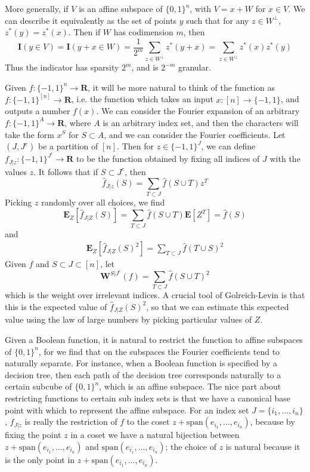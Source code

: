 More generally, if $V$ is an affine subspace of $\{ 0, 1 \}^n$, with $V = x + W$ for $x \in V$. We can describe it equivalently as the set of points $y$ such that for any $z \in W^\perp$, $z^*(y) = z^*(x)$. Then if $W$ has codimension $m$, then
%
\[ \mathbf{I}(y \in V) = \mathbf{I}(y + x \in W) = \frac{1}{2^m} \sum_{z \in W^\perp} z^*(y + x) = \sum_{z \in W^\perp} z^*(x) z^*(y) \]
%
Thus the indicator has sparsity $2^m$, and is $2^{-m}$ granular.

Given $f: \{ -1, 1 \}^n \to \mathbf{R}$, it will be more natural to think of the function as $f: \{ -1, 1 \}^{[n]} \to \mathbf{R}$, i.e. the function which takes an input $x: [n] \to \{ -1, 1 \}$, and outputs a number $f(x)$. We can consider the Fourier expansion of an arbitrary $f: \{ -1, 1 \}^A \to \mathbf{R}$, where $A$ is an arbitrary index set, and then the characters will take the form $x^S$ for $S \subset A$, and we can consider the Fourier coefficients. Let $(J,J^c)$ be a partition of $[n]$. Then for $z \in \{ -1, 1 \}^J$, we can define $f_{J|z}: \{ -1, 1 \}^{J^c} \to \mathbf{R}$ to be the function obtained by fixing all indices of $J$ with the values $z$. It follows that if $S \subset J^c$, then
%
\[ \widehat{f}_{J|z}(S) = \sum_{T \subset J} \widehat{f}(S \cup T) z^T \]
%
Picking $z$ randomly over all choices, we find
%
\[ \mathbf{E}_Z[\widehat{f}_{J|Z}(S)] = \sum_{T \subset J} \widehat{f}(S \cup T) \mathbf{E}[Z^T] = \widehat{f}(S) \]
%
and
%
\begin{align*}
    \mathbf{E}_Z[\widehat{f}_{J|Z}(S)^2] = \sum_{T \subset J} \widehat{f}(T \cup S)^2
\end{align*}
%
Given $f$ and $S \subset J \subset [n]$, let
%
\[ \mathbf{W}^{S|J^c}(f) = \sum_{T \subset J} \widehat{f}(S \cup T)^2 \]
%
which is the weight over irrelevant indices. A crucial tool of Golreich-Levin is that this is the expected value of $\widehat{f}_{J|Z}(S)^2$, so that we can estimate this expected value using the law of large numbers by picking particular values of $Z$.

Given a Boolean function, it is natural to restrict the function to affine subspaces of $\{ 0,1 \}^n$, for we find that on the subspaces the Fourier coefficients tend to naturally separate. For instance, when a Boolean function is specified by a decision tree, then each path of the decision tree corresponds naturally to a certain subcube of $\{ 0, 1 \}^n$, which is an affine subspace. The nice part about restricting functions to certain sub index sets is that we have a canonical base point with which to represent the affine subspace. For an index set $J = \{ i_1, \dots, i_n \}$, $f_{J|z}$ is really the restriction of $f$ to the coset $z + \text{span}(e_{i_1}, \dots, e_{i_n})$, because by fixing the point $z$ in a coset we have a natural bijection between $z + \text{span}(e_{i_1}, \dots, e_{i_n})$ and $\text{span}(e_{i_1}, \dots, e_{i_n})$; the choice of $z$ is natural because it is the only point in $z + \text{span}(e_{i_1}, \dots, e_{i_n})$.



